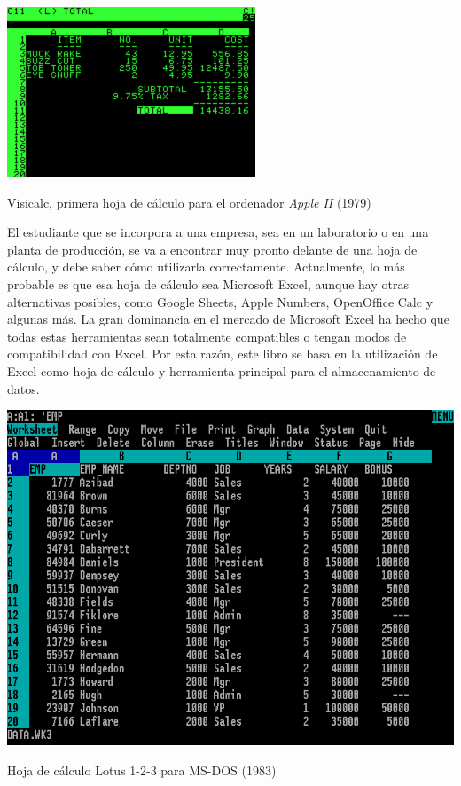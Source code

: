 \documentclass[
  letterpaper,
]{scrbook}
\begin{document}
\begin{marginfigure}

{\centering \includegraphics{./01-imagenes/280px-Visicalc.png}

}

\caption{Visicalc, primera hoja de cálculo para el ordenador \emph{Apple
II} (1979)}

\end{marginfigure}

El estudiante que se incorpora a una empresa, sea en un laboratorio o en
una planta de producción, se va a encontrar muy pronto delante de una
hoja de cálculo, y debe saber cómo utilizarla correctamente.
Actualmente, lo más probable es que esa hoja de cálculo sea Microsoft
Excel, aunque hay otras alternativas posibles, como Google Sheets, Apple
Numbers, OpenOffice Calc y algunas más. La gran dominancia en el mercado
de Microsoft Excel ha hecho que todas estas herramientas sean totalmente
compatibles o tengan modos de compatibilidad con Excel. Por esta razón,
este libro se basa en la utilización de Excel como hoja de cálculo y
herramienta principal para el almacenamiento de datos.

\begin{marginfigure}

{\centering \includegraphics{./01-imagenes/Lotus-123-3.0-MSDOS.png}

}

\caption{Hoja de cálculo Lotus 1-2-3 para MS-DOS (1983)}

\end{marginfigure}
\end{document}
